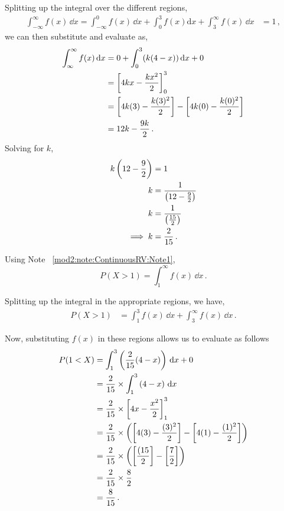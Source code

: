 \begin{subquestions}
\begin{subsubquestions}
Splitting up the integral over the different regions,
\begin{align}
	\int_{-\infty}^{\infty} f(x)\,\dd x = \int_{-\infty}^{0} f(x)\,\dd x + \int_{0}^{3} f(x)\mathrm{d}x + \int_{3}^{\infty} f(x)\,\dd x& = 1\,,
\end{align}
we can then substitute and evaluate as,
\begin{align}
\int_\infty^\infty f(x) \,\mathrm{d} x  &=0+ \int_{0}^{3} (k(4-x))\, \mathrm{d}x +0  \nonumber \\
	&=\left[ 4kx- \frac{kx^2}{2} \right]^3_0  \nonumber \\
	&=\left[ 4k(3)- \frac{k(3)^2}{2} \right] - \left[ 4k(0)- \frac{k(0)^2}{2} \right] \nonumber \\
	&=12k - \frac{9k}{2} \,.
\end{align}
Solving for $k$,
\begin{align}
	k \left(12 - \frac{9}{2}\right) &= 1 \nonumber \\
	k & = \frac{1}{\left(12 - \frac{9}{2}\right)} \nonumber \\
	k & = \frac{1}{\left(\frac{15}{2}\right)} \nonumber \\
	\implies k & = \frac{2}{15} \,.
\end{align}
	

\subsubquestion

Using Note ~\ref{mod2:note:ContinuousRV:Note1}, 
\begin{equation}
	P(X>1) = \int_{1}^\infty f(x) \,\dd x \,.
\end{equation}

Splitting up the integral in the appropriate regions, we have,
\begin{align}
	P(X>1) &= \int_{1}^3 f(x) \,\dd x + \int_{3}^\infty f(x) \,\dd x \,.
\end{align}

Now, substituting $f(x)$ in these regions allows us to evaluate as follows
\begin{align}
	P(1<X)  & =  \int_1^3 \left(\frac{2}{15}(4-x)\right) \,\mathrm{d} x + 0 \nonumber \\
	& = \frac{2}{15} \times \int_1^3 \left(4-x\right)\,\mathrm{d} x \nonumber \\
	& = \frac{2}{15} \times \left[ 4x- \frac{x^2}{2}\right]^3_1 \nonumber \\
	& = \frac{2}{15} \times \left( \left[ 4(3)- \frac{(3)^2}{2}\right] -\left[ 4(1)- \frac{(1)^2}{2}\right] \right) \nonumber \\
	& = \frac{2}{15} \times \left( \left[\frac{(15}{2}\right] -\left[ \frac{7}{2}\right] \right) \nonumber \\
	& = \frac{2}{15} \times \frac{8}{2} \nonumber \\
	& = \frac{8}{15} \,.	
\end{align}
	

\end{subsubquestions}
\end{subquestions}

